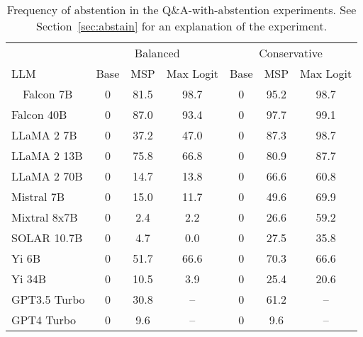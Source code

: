 \begin{table*}[h]
\centering
\caption{Frequency of abstention in the Q\&A-with-abstention experiments. See Section~\ref{sec:abstain} for an explanation of the experiment.}
\label{tab:pct_abstained}
\begin{tabular}{lcccccc}
\toprule
& \multicolumn{3}{c}{Balanced} & \multicolumn{3}{c}{Conservative} \\ 
LLM & Base & MSP & Max Logit & Base & MSP & Max Logit \\ 
\cmidrule(lr){1-1}\cmidrule(lr){2-4}\cmidrule(lr){5-7}\ \ 
Falcon 7B & 0 & 81.5 & 98.7 & 0 & 95.2 & 98.7\\
Falcon 40B & 0 & 87.0 & 93.4 & 0 & 97.7 & 99.1\\
LLaMA 2 7B & 0 & 37.2 & 47.0 & 0 & 87.3 & 98.7\\
LLaMA 2 13B & 0 & 75.8 & 66.8 & 0 & 80.9 & 87.7\\
LLaMA 2 70B & 0 & 14.7 & 13.8 & 0 & 66.6 & 60.8\\
Mistral 7B & 0 & 15.0 & 11.7 & 0 & 49.6 & 69.9\\
Mixtral 8x7B & 0 & 2.4 & 2.2 & 0 & 26.6 & 59.2\\
SOLAR 10.7B & 0 & 4.7 & 0.0 & 0 & 27.5 & 35.8\\
Yi 6B & 0 & 51.7 & 66.6 & 0 & 70.3 & 66.6\\
Yi 34B & 0 & 10.5 & 3.9 & 0 & 25.4 & 20.6\\
GPT3.5 Turbo & 0 & 30.8 & -- & 0 & 61.2 & --\\
GPT4 Turbo & 0 & 9.6 & -- & 0 & 9.6 & --\\
\bottomrule
\end{tabular}
\end{table*}
